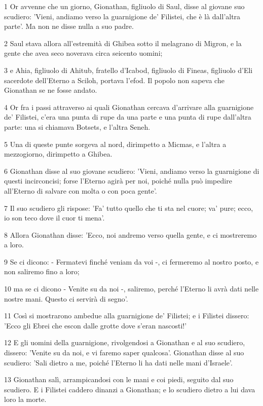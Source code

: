 \par 1 Or avvenne che un giorno, Gionathan, figliuolo di Saul, disse al giovane suo scudiero: 'Vieni, andiamo verso la guarnigione de' Filistei, che è là dall'altra parte'. Ma non ne disse nulla a suo padre.
\par 2 Saul stava allora all'estremità di Ghibea sotto il melagrano di Migron, e la gente che avea seco noverava circa seicento uomini;
\par 3 e Ahia, figliuolo di Ahitub, fratello d'Icabod, figliuolo di Fineas, figliuolo d'Eli sacerdote dell'Eterno a Sciloh, portava l'efod. Il popolo non sapeva che Gionathan se ne fosse andato.
\par 4 Or fra i passi attraverso ai quali Gionathan cercava d'arrivare alla guarnigione de' Filistei, c'era una punta di rupe da una parte e una punta di rupe dall'altra parte: una si chiamava Botsets, e l'altra Seneh.
\par 5 Una di queste punte sorgeva al nord, dirimpetto a Micmas, e l'altra a mezzogiorno, dirimpetto a Ghibea.
\par 6 Gionathan disse al suo giovane scudiero: 'Vieni, andiamo verso la guarnigione di questi incirconcisi; forse l'Eterno agirà per noi, poiché nulla può impedire all'Eterno di salvare con molta o con poca gente'.
\par 7 Il suo scudiero gli rispose: 'Fa' tutto quello che ti sta nel cuore; va' pure; ecco, io son teco dove il cuor ti mena'.
\par 8 Allora Gionathan disse: 'Ecco, noi andremo verso quella gente, e ci mostreremo a loro.
\par 9 Se ci dicono: - Fermatevi finché veniam da voi -, ci fermeremo al nostro posto, e non saliremo fino a loro;
\par 10 ma se ci dicono - Venite su da noi -, saliremo, perché l'Eterno li avrà dati nelle nostre mani. Questo ci servirà di segno'.
\par 11 Così si mostrarono ambedue alla guarnigione de' Filistei; e i Filistei dissero: 'Ecco gli Ebrei che escon dalle grotte dove s'eran nascosti!'
\par 12 E gli uomini della guarnigione, rivolgendosi a Gionathan e al suo scudiero, dissero: 'Venite su da noi, e vi faremo saper qualcosa'. Gionathan disse al suo scudiero: 'Sali dietro a me, poiché l'Eterno li ha dati nelle mani d'Israele'.
\par 13 Gionathan salì, arrampicandosi con le mani e coi piedi, seguito dal suo scudiero. E i Filistei caddero dinanzi a Gionathan; e lo scudiero dietro a lui dava loro la morte.
